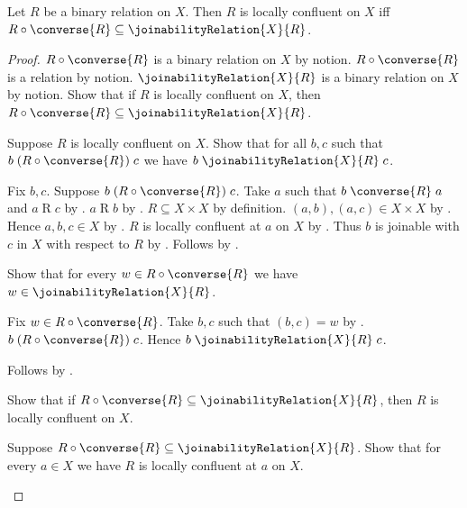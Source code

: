 \begin{proposition}\label{locally_confluent_on_iff_peak_relation}
    Let $R$ be a binary relation on $X$.
    Then $R$ is locally confluent on $X$ iff
        $R\circ\converse{R}\subseteq\joinabilityRelation{X}{R}$.
\end{proposition}
\begin{proof}
    $R\circ\converse{R}$ is a binary relation on $X$ by notion.
    $R\circ\converse{R}$ is a relation by notion.
    $\joinabilityRelation{X}{R}$ is a binary relation on $X$ by notion.
    Show that if $R$ is locally confluent on $X$, then
        $R\circ\converse{R}\subseteq\joinabilityRelation{X}{R}$.
    \begin{subproof}
        Suppose $R$ is locally confluent on $X$.
        Show that for all $b,c$ such that
            $b\mathrel{(R\circ\converse{R})}c$ we have
            $b\mathrel{\joinabilityRelation{X}{R}}c$.
        \begin{subproof}
            Fix $b,c$.
            Suppose $b\mathrel{(R\circ\converse{R})}c$.
            Take $a$ such that $b\mathrel{\converse{R}}a$ and
                $a\mathrel{R}c$ by .
            $a\mathrel{R}b$ by .
            $R\subseteq X\times X$ by definition.
            $(a,b),(a,c)\in X\times X$ by .
            Hence $a,b,c\in X$ by .
            $R$ is locally confluent at $a$ on $X$
                by .
            Thus $b$ is joinable with $c$ in $X$ with respect to $R$
                by .
            Follows by .
        \end{subproof}
        Show that for every $w\in R\circ\converse{R}$ we have
            $w\in\joinabilityRelation{X}{R}$.
        \begin{subproof}
            Fix $w\in R\circ\converse{R}$.
            Take $b,c$ such that $(b,c)=w$ by .
            $b\mathrel{(R\circ\converse{R})}c$.
            Hence $b\mathrel{\joinabilityRelation{X}{R}}c$.
        \end{subproof}
        Follows by .
    \end{subproof}
    Show that if
        $R\circ\converse{R}\subseteq\joinabilityRelation{X}{R}$, then
        $R$ is locally confluent on $X$.
    \begin{subproof}
        Suppose $R\circ\converse{R}\subseteq\joinabilityRelation{X}{R}$.
        Show that for every $a\in X$ we have
            $R$ is locally confluent at $a$ on $X$.

\end{subproof}
\end{proof}
